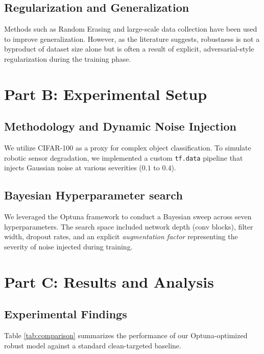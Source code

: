 \documentclass[11pt,a4paper]{article}
\begin{document}
\subsection{Regularization and Generalization}
Methods such as Random Erasing \cite{zhong2020random} and large-scale data collection \cite{levine2018learning} have been used to improve generalization. However, as the literature suggests, robustness is not a byproduct of dataset size alone but is often a result of explicit, adversarial-style regularization during the training phase.

\section{Part B: Experimental Setup}
\label{sec:methodology}

\subsection{Methodology and Dynamic Noise Injection}
We utilize CIFAR-100 as a proxy for complex object classification. To simulate robotic sensor degradation, we implemented a custom \texttt{tf.data} pipeline that injects Gaussian noise at various severities ($0.1$ to $0.4$).

\subsection{Bayesian Hyperparameter search}
We leveraged the Optuna framework to conduct a Bayesian sweep across seven hyperparameters. The search space included network depth (conv blocks), filter width, dropout rates, and an explicit \textit{augmentation factor} representing the severity of noise injected during training.

\section{Part C: Results and Analysis}
\label{sec:results}

\subsection{Experimental Findings}
Table \ref{tab:comparison} summarizes the performance of our Optuna-optimized robust model against a standard clean-targeted baseline.
\end{document}
